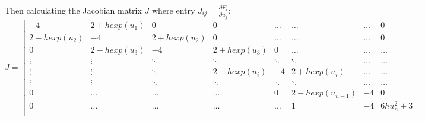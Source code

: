 \documentclass[fleqn]{report}
\begin{document}
Then calculating the Jacobian matrix $J$ where entry $J_{ij} = \frac{\partial F_i}{\partial u_j}$:
\[
 J=
\left[ {\begin{array}{cccccccc}
-4 & 2 +hexp(u_1) & 0 & 0 & \hdots & \hdots & \hdots & 0 \\
2 - hexp(u_2) & -4 & 2 + hexp(u_2) & 0 & \hdots & \hdots & \hdots & 0 \\ 
0 & 2 - hexp(u_3) & -4 & 2 + hexp(u_3) & 0 & \hdots & \hdots & \hdots \\
\vdots & \vdots & \ddots & \ddots & \ddots & \ddots & \hdots & \hdots\\
\vdots & \vdots & \ddots & 2 - hexp(u_i) & -4  & 2 + hexp(u_i) & \hdots & \hdots \\
\vdots & \vdots & \ddots & \ddots & \ddots & \ddots & \hdots & \hdots \\
0 & \hdots & \hdots & \hdots & 0 & 2 - hexp(u_{n-1}) & -4 & 0 \\
0 & \hdots & \hdots & \hdots & \hdots & 1 & -4 & 6hu^2_n + 3\\
  \end{array} } \right]
\]
\end{document}
